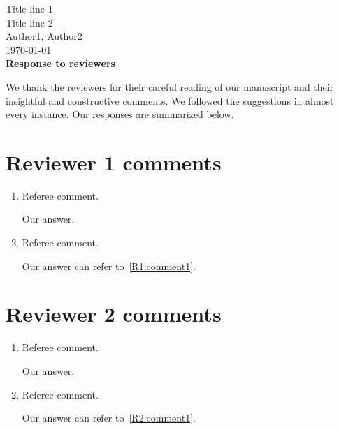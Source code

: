 \documentclass[11pt]{article}
\begin{document}
\begin{center} \Large
   Title line 1
\\ Title line 2
\\[6pt] \large Author1, Author2
\\[6pt] \today
\\[12pt]\Large \bf Response to reviewers
\end{center}

\noindent We thank the reviewers for their careful reading of our manuscript and their insightful and constructive comments. We followed the suggestions in almost every instance. Our responses are summarized below.

\section*{Reviewer 1 comments}

\begin{enumerate}[label={\color{black}R1.\arabic*}]
  \item\label{R1:comment1} Referee comment.

  \begin{answer}
    Our answer.
  \end{answer}

  \item Referee comment.

  \begin{answer}
    Our answer can refer to~\ref{R1:comment1}.
  \end{answer}
  
\end{enumerate}


\section*{Reviewer 2 comments}

\begin{enumerate}[label={\color{black}R2.\arabic*}]

  \item\label{R2:comment1} Referee comment.

  \begin{answer}
    Our answer.
  \end{answer}

  \item Referee comment.

  \begin{answer}
    Our answer can refer to~\ref{R2:comment1}.
  \end{answer}

\end{enumerate}
\end{document}
